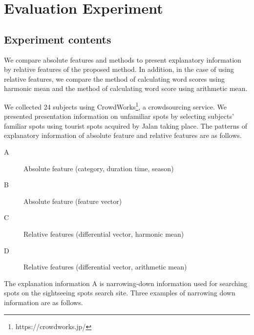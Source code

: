\documentclass[journal]{IAENGtran}
\begin{document}
\section{Evaluation Experiment}
\label{sec:Evaluation Experiment}
\subsection{Experiment contents}
\label{subsec:Experiment contents}

We compare absolute features and methods to present explanatory information by relative features of the proposed method.
In addition, in the case of using relative features, we compare the method of calculating word scores using harmonic mean and the method of calculating word score using arithmetic mean.

We collected 24 subjects using CrowdWorks\footnote{https://crowdworks.jp/}, a crowdsourcing service.
We presented presentation information on unfamiliar spots by selecting subjects' familiar spots using tourist spots acquired by Jalan taking place.
The patterns of explanatory information of absolute feature and relative features are as follows.
\begin{description}
\item[A]Absolute feature (category, duration time, season)
\item[B]Absolute feature (feature vector)
\item[C]Relative features (differential vector, harmonic mean)
\item[D]Relative features (differential vector, arithmetic mean)
\end{description}

The explanation information A is narrowing-down information used for searching spots on the sightseeing spots search site. Three examples of narrowing down information are as follows.
\end{document}
